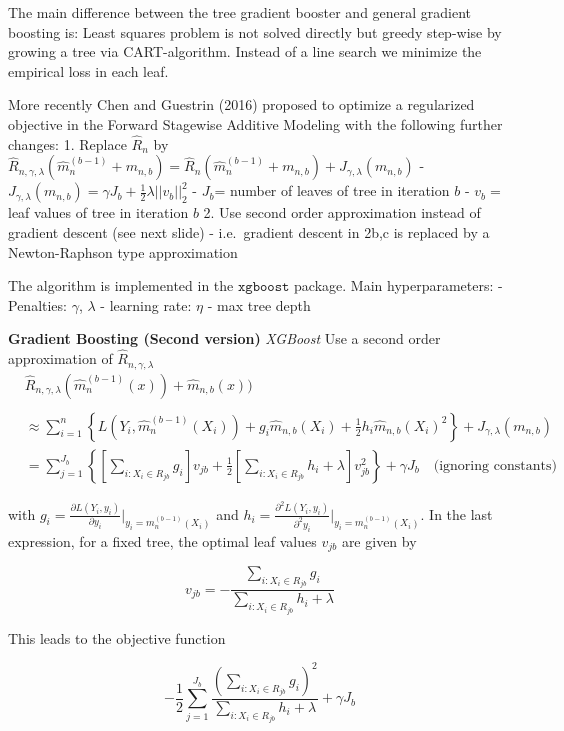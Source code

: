 \documentclass[a4paper,10pt,openany]{book}
\begin{document}
The main difference between the tree gradient booster and general gradient boosting is: Least squares problem is not solved directly but greedy step-wise by growing a tree via CART-algorithm. Instead of a line search we minimize the empirical loss in each leaf.

More recently Chen and Guestrin (2016) proposed to optimize a regularized objective in the Forward Stagewise Additive Modeling with the following further changes:
1. Replace \(\hat R_n\) by \(\hat R_{n,\gamma,\lambda}(\hat m_n^{(b-1)}+m_{n,b}) =\hat R_n(\hat m_n^{(b-1)}+m_{n,b}) + J_{\gamma,\lambda}(m_{n,b})\)
- \(J_{\gamma,\lambda}(m_{n,b})= \gamma J_b+ \frac 1 2 \lambda ||v_b||_2^2\)
- \(J_b\)= number of leaves of tree in iteration \(b\)
- \(v_b=\) leaf values of tree in iteration \(b\)
2. Use second order approximation instead of gradient descent (see next slide)
- i.e.~gradient descent in 2b,c is replaced by a Newton-Raphson type approximation

The algorithm is implemented in the \(\texttt{xgboost}\) package. Main hyperparameters:
- Penalties: \(\gamma\), \(\lambda\)
- learning rate: \(\eta\)
- max tree depth

\textbf{Gradient Boosting (Second version)} \emph{XGBoost} Use a second order approximation of \(\hat R_{n,\gamma,\lambda}\)
\begin{align}
&\hat R_{n,\gamma,\lambda}(\hat m_n^{(b-1)}(x))+\hat m_{n,b}(x))\\
\\&\approx\sum_{i=1}^n \left\{ L(Y_i,\hat 
m_n^{(b-1)}(X_i))+ g_i\hat m_{n,b}(X_i)+ \frac 1 2 h_i \hat m_{n,b}(X_i)^2\right \}+ J_{\gamma,\lambda}(m_{n,b})\\
&= \sum_{j=1}^{J_b}\left \{ \left[\sum_{i: X_i \in R_{jb}}g_i\right]v_{jb} + \frac 1 2 \left[\sum_{i: X_i \in R_{jb}}h_i+\lambda\right]v_{jb}^2 \right\}+\gamma J_b \quad \text{(ignoring constants)}
\end{align}

with \(g_i= \frac{\partial L(Y_i,y_i)}{\partial y_i} \Bigr\rvert_{y_i=m_n^{(b-1)}(X_i)}\) and \(h_i= \frac{\partial^2 L(Y_i,y_i)}{\partial^2 y_i} \Bigr\rvert_{y_i=m_n^{(b-1)}(X_i)}\). In the last expression, for a fixed tree, the optimal leaf values \(v_{jb}\) are given by

\[
v_{jb}=-\frac{\sum_{i: X_i \in R_{jb}} g_i }{\sum_{i: X_i \in R_{jb}} h_i+\lambda}
\]

This leads to the objective function

\[
-\frac 1 2\sum_{j=1}^{J_b} \frac {(\sum_{i: X_i \in R_{jb}}g_i)^2}{\sum_{i: X_i \in R_{jb}}h_i+\lambda}+\gamma J_b
\]
\end{document}
